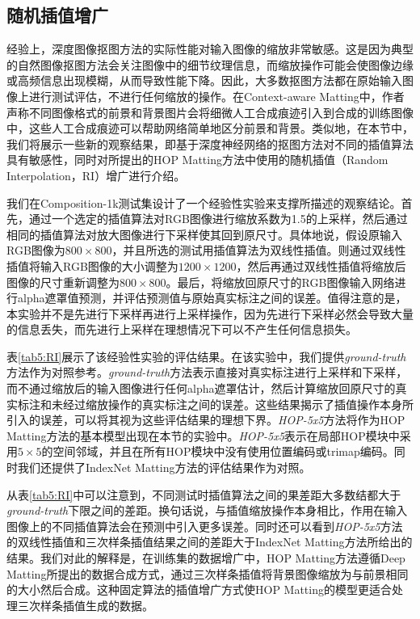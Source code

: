 \subsection{随机插值增广}
\label{sec5:RI}
经验上，深度图像抠图方法的实际性能对输入图像的缩放非常敏感。这是因为典型的自然图像抠图方法会关注图像中的细节纹理信息，而缩放操作可能会使图像边缘或高频信息出现模糊，从而导致性能下降。因此，大多数抠图方法都在原始输入图像上进行测试评估，不进行任何缩放的操作。在Context-aware Matting\cite{hou2019context}中，作者声称不同图像格式的前景和背景图片会将细微人工合成痕迹引入到合成的训练图像中，这些人工合成痕迹可以帮助网络简单地区分前景和背景。类似地，在本节中，我们将展示一些新的观察结果，即基于深度神经网络的抠图方法对不同的插值算法具有敏感性，同时对所提出的HOP Matting方法中使用的随机插值（Random Interpolation，RI）增广进行介绍。

我们在Composition-1k测试集\cite{xu2017deep}设计了一个经验性实验来支撑所描述的观察结论。首先，通过一个选定的插值算法对RGB图像进行缩放系数为1.5的上采样，然后通过相同的插值算法对放大图像进行下采样使其回到原尺寸。具体地说，假设原输入RGB图像为$800 \times 800$，并且所选的测试用插值算法为双线性插值。则通过双线性插值将输入RGB图像的大小调整为$1200 \times 1200$，然后再通过双线性插值将缩放后图像的尺寸重新调整为$800\times 800$。最后，将缩放回原尺寸的RGB图像输入网络进行alpha遮罩值预测，并评估预测值与原始真实标注之间的误差。值得注意的是，本实验并不是先进行下采样再进行上采样操作，因为先进行下采样必然会导致大量的信息丢失，而先进行上采样在理想情况下可以不产生任何信息损失。


表\ref{tab5:RI}展示了该经验性实验的评估结果。在该实验中，我们提供\textit{ground-truth}方法作为对照参考。\textit{ground-truth}方法表示直接对真实标注进行上采样和下采样，而不通过缩放后的输入图像进行任何alpha遮罩估计，然后计算缩放回原尺寸的真实标注和未经过缩放操作的真实标注之间的误差。这些结果揭示了插值操作本身所引入的误差，可以将其视为这些评估结果的理想下界。\textit{HOP-5x5}方法将作为HOP Matting方法的基本模型出现在本节的实验中。\textit{HOP-5x5}表示在局部HOP模块中采用$5\times 5$的空间邻域，并且在所有HOP模块中没有使用位置编码或trimap编码。同时我们还提供了IndexNet Matting\cite{lu2019indices}方法的评估结果作为对照。

从表\ref{tab5:RI}中可以注意到，不同测试时插值算法之间的果差距大多数结都大于\textit{ground-truth}下限之间的差距。换句话说，与插值缩放操作本身相比，作用在输入图像上的不同插值算法会在预测中引入更多误差。同时还可以看到\textit{HOP-5x5}方法的双线性插值和三次样条插值结果之间的差距大于IndexNet Matting\cite{lu2019indices}方法所给出的结果。我们对此的解释是，在训练集的数据增广中，HOP Matting方法遵循Deep Matting\cite{xu2017deep}所提出的数据合成方式，通过三次样条插值将背景图像缩放为与前景相同的大小然后合成。这种固定算法的插值增广方式使HOP Matting的模型更适合处理三次样条插值生成的数据。

